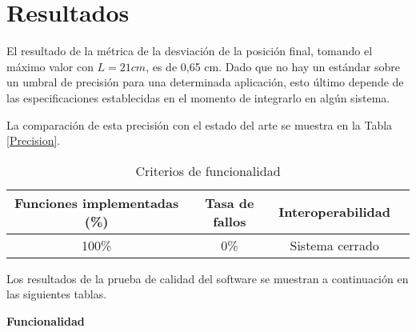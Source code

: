 \section{Resultados}

El resultado de la métrica de la desviación de la posición final, tomando el máximo valor con $L = 21 cm$, es de 0,65 cm. Dado que no hay un estándar sobre un umbral de precisión para una determinada aplicación, esto último depende de las especificaciones establecidas en el momento de integrarlo en algún sistema.

La comparación de esta precisión con el estado del arte se muestra en la Tabla \ref{Precision}.

\begin{table}[ht]
	\centering
	\begin{tabular}{|c|c|c|c|}
		\hline
		\textbf{Funciones implementadas (\%)} & \textbf{Tasa de fallos} & \textbf{Interoperabilidad} \\
		\hline
		100\% & 0\% & Sistema cerrado \\
		\hline
	\end{tabular}
	\caption{Criterios de funcionalidad}
	\label{tab:Precision}
\end{table}

Los resultados de la prueba de calidad del software se muestran a continuación en las siguientes tablas.

\textbf{Funcionalidad}

